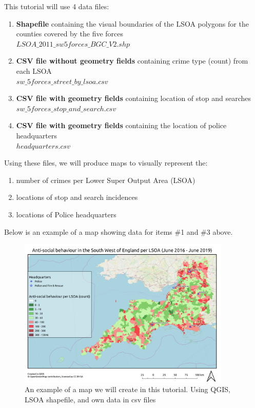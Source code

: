 \null\newpage

This tutorial will use 4 data files:
\begin{enumerate}[~~~1)]
	\item
	\textbf{Shapefile} containing the visual boundaries of the LSOA polygons for the counties covered by the five forces\\
	$LSOA\_2011\_sw5forces\_BGC\_V2.shp$
	\item
	\textbf{CSV file without geometry fields} containing crime type (count) from each LSOA\\
	$sw\_5forces\_street\_by\_lsoa.csv$
	\item
	\textbf{CSV file with geometry fields} containing location of stop and searches\\
	$sw\_5forces\_stop\_and\_search.csv$
	\item 
	\textbf{CSV file with geometry fields} containing the location of police headquarters\\
	$headquarters.csv$
\end{enumerate}

Using these files, we will produce maps to visually represent the:
\begin{enumerate}[~~~1)]
	\item
	number of crimes per Lower Super Output Area (LSOA)
	\item
	locations of stop and search incidences
	\item
	locations of Police headquarters
\end{enumerate}

Below is an example of a map showing data for items \#1 and \#3 above.
\begin{figure}[!h]
	\centering
	\includegraphics[width=0.9\textwidth]{images/headquarter_crime_map.png}
	\caption{An example of a map we will create in this tutorial. Using QGIS, LSOA shapefile, and own data in csv files}
	\label{ft_fig_firstfig3}
\end{figure}


